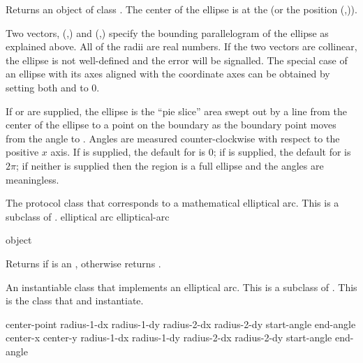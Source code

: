 Returns an object of class .  The center of the ellipse is
at the   (or the position
(,)).

Two vectors, (,) and
(,) specify the bounding parallelogram of the
ellipse as explained above.  All of the radii are real numbers.  If the two
vectors are collinear, the ellipse is not well-defined and the
 error will be signalled.  The special case of an
ellipse with its axes aligned with the coordinate axes can be obtained by
setting both  and  to 0.

If  or  are supplied, the ellipse is the ``pie
slice'' area swept out by a line from the center of the ellipse to a point on
the boundary as the boundary point moves from the angle  to
.  Angles are measured counter-clockwise with respect to the
positive $x$ axis.  If  is supplied, the default for
 is $0$; if  is supplied, the default for
 is $2\pi$; if neither is supplied then the region is a full
ellipse and the angles are meaningless.

\MayCaptureInputs



The protocol class that corresponds to a mathematical elliptical arc.  This is a
subclass of .
 {elliptical arc} {elliptical-arc}

 {object}

Returns  if  is an , otherwise
returns .


An instantiable class that implements an elliptical arc.  This is a subclass of
.  This is the class that  and
 instantiate.
\Immutable

  {center-point
                               radius-1-dx radius-1-dy radius-2-dx radius-2-dy
                               \key start-angle end-angle}
 {center-x center-y 
                               radius-1-dx radius-1-dy radius-2-dx radius-2-dy
                               \key start-angle end-angle}

